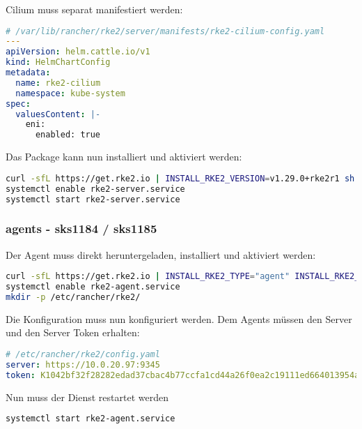 Cilium muss separat manifestiert werden:
\lstset{style=gra_codestyle}
\begin{lstlisting}[language=yaml, caption=rke2 server - cilium-config.yaml,captionpos=b,label={lst:rke2-server-cilium-config.yaml},breaklines=true]
# /var/lib/rancher/rke2/server/manifests/rke2-cilium-config.yaml
---
apiVersion: helm.cattle.io/v1
kind: HelmChartConfig
metadata:
  name: rke2-cilium
  namespace: kube-system
spec:
  valuesContent: |-
    eni:
      enabled: true
\end{lstlisting}

Das Package kann nun installiert und aktiviert werden:
\lstset{style=gra_codestyle}
\begin{lstlisting}[language=bash, caption=rke2 server installieren,captionpos=b,label={lst:install-rke2-server},breaklines=true]
curl -sfL https://get.rke2.io | INSTALL_RKE2_VERSION=v1.29.0+rke2r1 sh -
systemctl enable rke2-server.service
systemctl start rke2-server.service
\end{lstlisting}

\subsubsection{agents - sks1184 / sks1185}
Der Agent muss direkt heruntergeladen, installiert und aktiviert werden:
\lstset{style=gra_codestyle}
\begin{lstlisting}[language=bash, caption=rke2 agenten installieren,captionpos=b,label={lst:install-rke2-agent},breaklines=true]
curl -sfL https://get.rke2.io | INSTALL_RKE2_TYPE="agent" INSTALL_RKE2_VERSION=v1.29.0+rke2r1 sh -
systemctl enable rke2-agent.service
mkdir -p /etc/rancher/rke2/
\end{lstlisting}

Die Konfiguration muss nun konfiguriert werden.
Dem Agents müssen den Server und den Server Token erhalten:
\lstset{style=gra_codestyle}
\begin{lstlisting}[language=yaml, caption=rke2 agent - config.yaml,captionpos=b,label={lst:rke2-agent-config.yaml},breaklines=true]
# /etc/rancher/rke2/config.yaml
server: https://10.0.20.97:9345
token: K1042bf32f28282edad37cbac4b77ccfa1cd44a26f0ea2c19111ed664013954a326::server:7a430a28b29501b778543f0882a156b8
\end{lstlisting}

Nun muss der Dienst restartet werden
\lstset{style=gra_codestyle}
\begin{lstlisting}[language=bash, caption=-rke2 agent service restart,captionpos=b,label={lst:rke2-agent-service-restart},breaklines=true]
systemctl start rke2-agent.service
\end{lstlisting}

